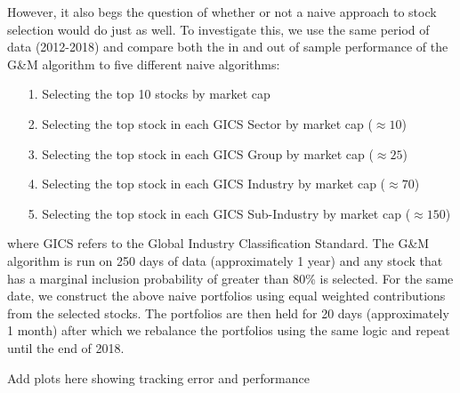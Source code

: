 \documentclass[a4paper, 12pt]{article}
\theoremstyle{plain}
\theoremstyle{definition}
\theoremstyle{remark}
\begin{document}
However, it also begs the question of whether or not a naive approach to stock selection would do just as well. To investigate this, we use the same period of data (2012-2018) and compare both the in and out of sample performance of the G\&M algorithm to five different naive algorithms:
\begin{itemize}
	\itemsep=0em
	\item[1.] Selecting the top 10 stocks by market cap
	\item[2.] Selecting the top stock in each GICS Sector by market cap ($\approx 10$)
	\item[3.] Selecting the top stock in each GICS Group by market cap ($\approx 25$)
	\item[4.] Selecting the top stock in each GICS Industry by market cap ($\approx 70$)
	\item[5.] Selecting the top stock in each GICS Sub-Industry by market cap ($\approx 150$)
\end{itemize}
where GICS refers to the Global Industry Classification Standard. The G\&M algorithm is run on 250 days of data (approximately 1 year) and any stock that has a marginal inclusion probability of greater than 80\% is selected. For the same date, we construct the above naive portfolios using equal weighted contributions from the selected stocks. The portfolios are then held for 20 days (approximately 1 month) after which we rebalance the portfolios using the same logic and repeat until the end of 2018.

{\color{red} Add plots here showing tracking error and performance}
\end{document}
